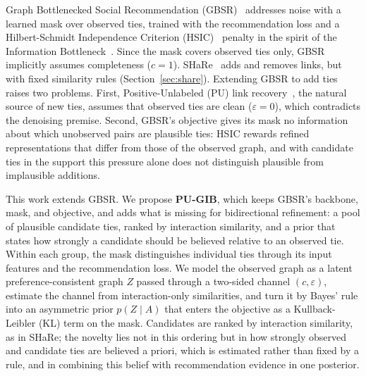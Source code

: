 \documentclass[sigconf]{acmart}
\begin{document}
Graph Bottlenecked Social Recommendation (GBSR)~\cite{10.1145/3637528.3671807} addresses noise with a learned mask over observed ties, trained with the recommendation loss and a Hilbert-Schmidt Independence Criterion (HSIC)~\cite{gretton2005measuring} penalty in the spirit of the Information Bottleneck~\cite{tishby2000informationbottleneckmethod}. Since the mask covers observed ties only, GBSR implicitly assumes completeness ($c = 1$). SHaRe~\cite{10.1145/3589334.3645460} adds and removes links, but with fixed similarity rules (Section~\ref{sec:share}). Extending GBSR to add ties raises two problems. First, Positive-Unlabeled (PU) link recovery~\cite{10.1145/1401890.1401920, 10.1609/aaai.v39i17.33966}, the natural source of new ties, assumes that observed ties are clean ($\varepsilon = 0$), which contradicts the denoising premise. Second, GBSR's objective gives its mask no information about which unobserved pairs are plausible ties: HSIC rewards refined representations that differ from those of the observed graph, and with candidate ties in the support this pressure alone does not distinguish plausible from implausible additions.

This work extends GBSR. We propose \textbf{PU-GIB}, which keeps GBSR's backbone, mask, and objective, and adds what is missing for bidirectional refinement: a pool of plausible candidate ties, ranked by interaction similarity, and a prior that states how strongly a candidate should be believed relative to an observed tie. Within each group, the mask distinguishes individual ties through its input features and the recommendation loss. We model the observed graph as a latent preference-consistent graph $Z$ passed through a two-sided channel $(c, \varepsilon)$, estimate the channel from interaction-only similarities, and turn it by Bayes' rule into an asymmetric prior $p(Z \mid A)$ that enters the objective as a Kullback-Leibler (KL) term on the mask. Candidates are ranked by interaction similarity, as in SHaRe; the novelty lies not in this ordering but in how strongly observed and candidate ties are believed a priori, which is estimated rather than fixed by a rule, and in combining this belief with recommendation evidence in one posterior.
\end{document}
